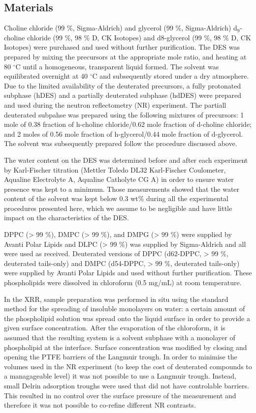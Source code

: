 \documentclass[twoside,twocolumn,9pt]{article}
\begin{document}
\subsection{Materials}
Choline chloride (99 \%, Sigma-Aldrich) and glycerol (99 \%, Sigma-Aldrich) d$_9$-choline chloride (99 \%, 98 \% D, CK Isotopes) and d8-glycerol (99 \%, 98 \% D, CK Isotopes)  were purchased and used without further purification. The DES was prepared by mixing the precursors at the appropriate mole ratio, and heating at 80 $^\circ$C until a homogeneous, transparent liquid formed.\cite{Smith2014} The solvent was equilibrated overnight at 40 $^\circ$C and subsequently stored under a dry atmosphere. Due to the limited availability of the deuterated precursors, a fully protonated subphase (hDES) and a partially deuterated subphase (hdDES) were prepared and used during the neutron reflectometry (NR) experiment. The partiall deuterated subpahse was prepared using the following mixtures of precursors: 1 mole of 0.38 fraction of h-choline chloride/0.62 mole fraction of d-choline chloride; and 2 moles of 0.56 mole fraction of h-glycerol/0.44 mole fraction of d-glycerol. The solvent was subsequently prepared follow the procedure discussed above. 

The water content on the DES was determined before and after each experiment by Karl-Fischer titration (Mettler Toledo DL32 Karl-Fischer Coulometer, Aqualine Electrolyte A, Aqualine Catholyte CG A) in order to ensure water presence was kept to a minimum. Those measurements showed that the water content of the solvent was kept below 0.3 wt\% during all the experimental procedures presented here, which we assume to be negligible and have little impact on the characteristics of the DES.\cite{Hammond2016,Hammond2017}

DPPC (> 99 \%), DMPC (> 99 \%), and DMPG (> 99 \%) were supplied by Avanti Polar Lipids and DLPC (> 99 \%) was supplied by Sigma-Aldrich and all were used as received. Deuterated versions of DPPC (d62-DPPC, > 99 \%, deuterated tails-only) and DMPC (d54-DPPC, > 99 \%, deuterated tails-only) were supplied by Avanti Polar Lipids and used without further purification. These phospholipids were dissolved in chloroform (0.5 mg/mL) at room temperature. 

In the XRR, sample preparation was performed in situ using the standard method for the spreading of insoluble monolayers on water: a certain amount of the phospholipid solution was spread onto the liquid surface in order to provide a given surface concentration. After the evaporation of the chloroform, it is assumed that the resulting system is a solvent subphase with a monolayer of phospholipid at the interface. Surface concentration was modified by closing and opening the PTFE barriers of the Langmuir trough. In order to minimise the volumes used in the NR experiment (to keep the cost of deuterated compounds to a managageable level) it was not possible to use a Langmuir trough. Instead, small Delrin adsorption troughs were used that did not have controlable barriers. This resulted in no control over the surface pressure of the measurement and therefore it was not possible to co-refine different NR contrasts. 
\end{document}
